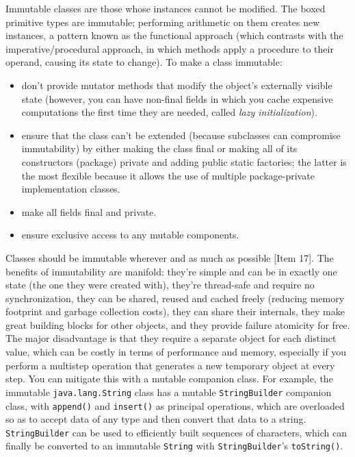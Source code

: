 \documentclass[table, xcdraw]{article}%
\begin{document}
Immutable classes are those whose instances cannot be modified. The boxed primitive types are immutable; performing arithmetic on them creates new instances, a pattern known as the functional approach (which contrasts with the imperative/procedural approach, in which methods apply a procedure to their operand, causing its state to change). To make a class immutable:

\begin{itemize}
    \item don't provide mutator methods that modify the object's externally visible state (however, you can have non-final fields in which you cache expensive computations the first time they are needed, called \emph{lazy initialization}).
    \item ensure that the class can't be extended (because subclasses can compromise immutability) by either making the class final or making all of its constructors (package) private and adding public static factories; the latter is the most flexible because it allows the use of multiple package-private implementation classes.
    \item make all fields final and private.
    \item ensure exclusive access to any mutable components.
\end{itemize}

Classes should be immutable wherever and as much as possible [Item 17]. The benefits of immutability are manifold: they're simple and can be in exactly one state (the one they were created with), they're thread-safe and require no synchronization, they can be shared, reused and cached freely (reducing memory footprint and garbage collection costs), they can share their internals, they make great building blocks for other objects, and they provide failure atomicity for free. The major disadvantage is that they require a separate object for each distinct value, which can be costly in terms of performance and memory, especially if you perform a multistep operation that generates a new temporary object at every step. You can mitigate this with a mutable companion class. For example, the immutable \texttt{java.lang.String} class has a mutable \texttt{StringBuilder} companion class, with \texttt{append()} and \texttt{insert()} as principal operations, which are overloaded so as to accept data of any type and then convert that data to a string. \texttt{StringBuilder} can be used to efficiently built sequences of characters, which can finally be converted to an immutable \texttt{String} with \texttt{StringBuilder}'s \texttt{toString()}.
\end{document}
